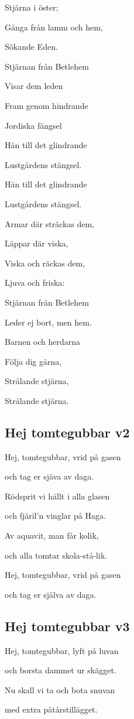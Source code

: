 Stjärna i öster;\bigskip

Gånga från lamm och hem,

Sökande Eden.

Stjärnan från Betlehem

Visar dem leden

Fram genom hindrande

Jordiska fängsel

Hän till det glindrande

Lustgårdens stängsel.

Hän till det glindrande

Lustgårdens stängsel.\bigskip

Armar där sträckas dem,

Läppar där viska,

Viska och räckas dem,

Ljuva och friska:

Stjärnan från Betlehem

Leder ej bort, men hem.

Barnen och herdarna

Följa dig gärna,

Strålande stjärna,

Strålande stjärna. 

\subsection{\textbf{Hej tomtegubbar v2 }}


Hej, tomtegubbar, vrid på gasen

och tag er sjäva av daga.

Rödsprit vi hällt i alla glasen

och fjäril’n vinglar på Haga.

Av aquavit, man får kolik,

och alla tomtar skola-stå-lik.

Hej, tomtegubbar, vrid på gasen

och tag er själva av daga.

\subsection{\textbf{Hej tomtegubbar v3}}


Hej, tomtegubbar, lyft på luvan

och borsta dammet ur skägget.

Nu skall vi ta och bota snuvan

med extra påtårstillägget.

